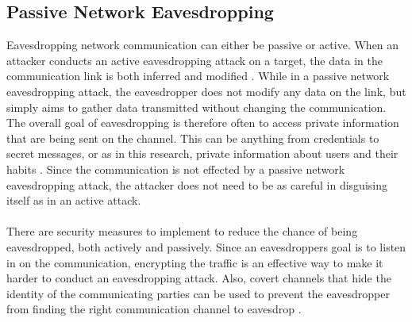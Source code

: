 \subsection{Passive Network Eavesdropping}
Eavesdropping network communication can either be passive or active. When an attacker conducts an active eavesdropping attack on a target, the data in the communication link is both inferred and modified \cite{Eavesdropping}. While in a passive network eavesdropping attack, the eavesdropper does not modify any data on the link, but simply aims to gather data transmitted without changing the communication. The overall goal of eavesdropping is therefore often to access private information that are being sent on the channel. This can be anything from credentials to secret messages, or as in this research, private information about users and their habits \cite{Eavesdropping}. Since the communication is not effected by a passive network eavesdropping attack, the attacker does not need to be as careful in disguising itself as in an active attack.  
\\\\
There are security measures to implement to reduce the chance of being eavesdropped, both actively and passively. Since an eavesdroppers goal is to listen in on the communication, encrypting the traffic is an effective way to make it harder to conduct an eavesdropping attack. Also, covert channels that hide the identity of the communicating parties can be used to prevent the eavesdropper from finding the right communication channel to eavesdrop \cite{Eavesdropping}.
\\\\
